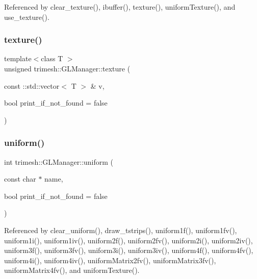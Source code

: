 Referenced by clear\+\_\+texture(), ibuffer(), texture(), uniform\+Texture(), and use\+\_\+texture().

\mbox{\label{classtrimesh_1_1GLManager_a21b8ae8f989ddd0a5bd339abf653b11e}} 
\subsubsection{\texorpdfstring{texture()}{texture()}\hspace{0.1cm}{\footnotesize\ttfamily [2/2]}}
{\footnotesize\ttfamily template$<$class T $>$ \\
unsigned trimesh\+::\+G\+L\+Manager\+::texture (\begin{DoxyParamCaption}\item[{const \+::std\+::vector$<$ T $>$ \&}]{v,  }\item[{bool}]{print\+\_\+if\+\_\+not\+\_\+found = {\ttfamily false} }\end{DoxyParamCaption})\hspace{0.3cm}{\ttfamily [inline]}}

\mbox{\label{classtrimesh_1_1GLManager_a4a646dab9afe96f525fde2844482f898}} 
\subsubsection{\texorpdfstring{uniform()}{uniform()}}
{\footnotesize\ttfamily int trimesh\+::\+G\+L\+Manager\+::uniform (\begin{DoxyParamCaption}\item[{const char $\ast$}]{name,  }\item[{bool}]{print\+\_\+if\+\_\+not\+\_\+found = {\ttfamily false} }\end{DoxyParamCaption})}



Referenced by clear\+\_\+uniform(), draw\+\_\+tstrips(), uniform1f(), uniform1fv(), uniform1i(), uniform1iv(), uniform2f(), uniform2fv(), uniform2i(), uniform2iv(), uniform3f(), uniform3fv(), uniform3i(), uniform3iv(), uniform4f(), uniform4fv(), uniform4i(), uniform4iv(), uniform\+Matrix2fv(), uniform\+Matrix3fv(), uniform\+Matrix4fv(), and uniform\+Texture().


